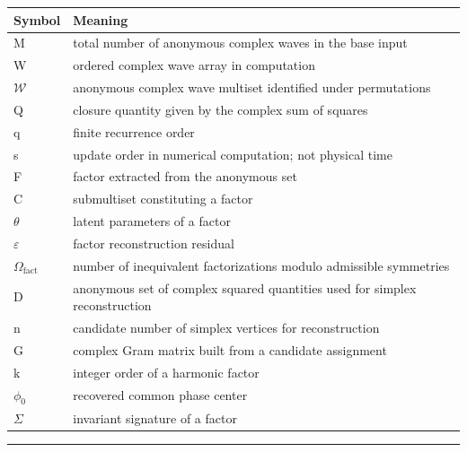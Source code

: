 \documentclass[
  a4paper,
]{article}
\newcounter{none} %
\begin{document}
{\def\LTcaptype{none} %
\begin{longtable}[]{@{}
  >{\raggedright\arraybackslash}p{}
  >{\raggedright\arraybackslash}p{}@{}}
\toprule\noalign{}
\begin{minipage}[b]{\linewidth}\raggedright
Symbol
\end{minipage} & \begin{minipage}[b]{\linewidth}\raggedright
Meaning
\end{minipage} \\
\midrule\noalign{}
\endhead
\bottomrule\noalign{}
\endlastfoot
M & total number of anonymous complex waves in the base input \\
W & ordered complex wave array in computation \\
\(\mathcal W\) & anonymous complex wave multiset identified under
permutations \\
Q & closure quantity given by the complex sum of squares \\
q & finite recurrence order \\
s & update order in numerical computation; not physical time \\
F & factor extracted from the anonymous set \\
C & submultiset constituting a factor \\
\(\theta\) & latent parameters of a factor \\
\(\varepsilon\) & factor reconstruction residual \\
\(\Omega_{\mathrm{fact}}\) & number of inequivalent factorizations
modulo admissible symmetries \\
D & anonymous set of complex squared quantities used for simplex
reconstruction \\
n & candidate number of simplex vertices for reconstruction \\
G & complex Gram matrix built from a candidate assignment \\
k & integer order of a harmonic factor \\
\(\phi_0\) & recovered common phase center \\
\(\Sigma\) & invariant signature of a factor \\
\end{longtable}
}

\begin{center}\rule{0.5\linewidth}{0.5pt}\end{center}
\end{document}
